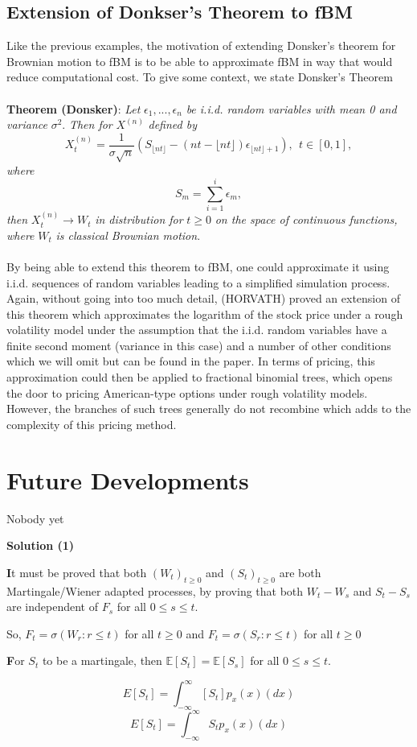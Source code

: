 \documentclass[12pt]{article}
\newcommand{\E}{\mathbb{E}}
\begin{document}
\subsection{Extension of Donkser's Theorem to fBM}
Like the previous examples, the motivation of extending Donsker's theorem for Brownian motion to fBM is to be able to approximate fBM in way that would reduce computational cost. To give some context,  we state Donsker's Theorem
\\
\\
 \textbf{Theorem (Donsker)}: \textit{Let} $\epsilon_1,...,\epsilon_n$ \textit{be i.i.d. random variables with mean 0 and variance} $\sigma^2$. \textit{Then for} $X^{(n)}$ \textit{defined by} $$X_t^{(n)} = \frac{1}{\sigma \sqrt{n}} (S_{\lfloor nt \rfloor} - (nt - \lfloor nt \rfloor) \epsilon_{\lfloor nt \rfloor + 1}), \ \ t\in[0,1],$$ \textit{where} $$S_m = \sum_{i=1}^i \epsilon_m,$$ \textit{then} $X_t^{(n)} \rightarrow W_t$ \textit{in distribution for} $t\ge0$ \textit{on the space of continuous functions, where} $W_t$ \textit{is classical Brownian motion}.
\\
\\
By being able to extend this theorem to fBM, one could approximate it using i.i.d. sequences of random variables leading to a simplified simulation process. Again, without going into too much detail, ({\color{red}HORVATH}) proved an extension of this theorem which approximates the logarithm of the stock price under a rough volatility model under the assumption that the i.i.d. random variables have a finite second moment (variance in this case) and a number of other conditions which we will omit but can be found in the paper. In terms of pricing, this approximation could then be applied to fractional binomial trees, which opens the door to pricing American-type options under rough volatility models. However, the branches of such trees generally do not recombine which adds to the complexity of this pricing method.   

\section{Future Developments}
Nobody yet

\noindent\textbf{Solution (1)}

\textbf
It must be proved that both $(W_t)_{t\geq0}$ and $(S_t)_{t\geq0}$ are both Martingale/Wiener adapted processes,  by proving that both $W_t - W_s$ and $S_t - S_s$ are independent of $F_s$ for all $0\leq s \leq t$.

 So, $F_t = \sigma (W_r: r\leq t)$ for all $t\geq 0$ and $F_t = \sigma (S_r: r\leq t)$ for all $t\geq 0$

\noindent\textbf For $S_t$ to be a martingale, then $\E [S_t] = \E [S_s]$ for all $0\leq s \leq t$.

\[
    E[S_t] =  \int_{-\infty}^{\infty} [S_t] p_x(x) (dx) 
\]
\[
    E[S_t] =  \int_{-\infty}^{\infty} S_t p_x(x) (dx) 
\]
\end{document}
